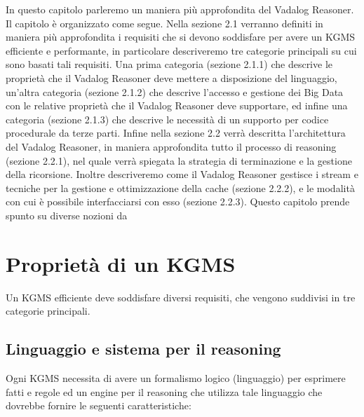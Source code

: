 In questo capitolo parleremo un maniera più approfondita del Vadalog Reasoner. \newline
Il capitolo è organizzato come segue. Nella sezione 2.1 verranno definiti in maniera più approfondita i requisiti che si devono soddisfare per avere un KGMS efficiente e performante, in particolare descriveremo tre categorie principali su cui sono basati tali requisiti. Una prima categoria (sezione 2.1.1) che descrive le proprietà che il Vadalog Reasoner deve mettere a disposizione del linguaggio, un'altra categoria (sezione 2.1.2) che descrive l'accesso e gestione dei Big Data con le relative proprietà che il Vadalog Reasoner deve supportare, ed infine una categoria (sezione 2.1.3) che descrive le necessità di un supporto per codice procedurale da terze parti. \newline
Infine nella sezione 2.2 verrà descritta l'architettura del Vadalog Reasoner, in maniera approfondita tutto il processo di reasoning (sezione 2.2.1), nel quale verrà spiegata la strategia di terminazione e la gestione della ricorsione. Inoltre descriveremo come il Vadalog Reasoner gestisce i stream e tecniche per la gestione e ottimizzazione della cache (sezione 2.2.2), e le modalità con cui è possibile interfacciarsi con esso (sezione 2.2.3).
Questo capitolo prende spunto su diverse nozioni da~\cite{bellomarini2017swift}

\section{Proprietà di un KGMS}

Un KGMS efficiente deve soddisfare diversi requisiti, che vengono suddivisi in tre categorie principali.

\subsection{Linguaggio e sistema per il reasoning}

Ogni KGMS necessita di avere un formalismo logico (linguaggio) per esprimere fatti e regole ed un engine per il reasoning che utilizza tale linguaggio che dovrebbe fornire le seguenti caratteristiche:


